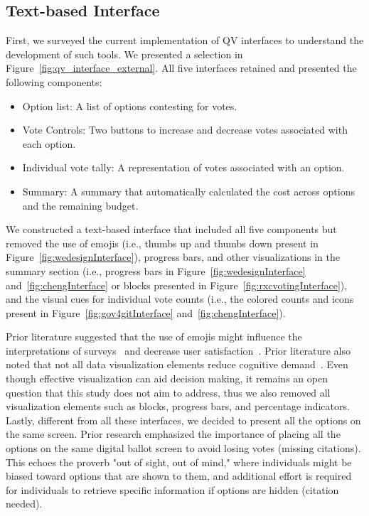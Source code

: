 \subsection{Text-based Interface}
First, we surveyed the current implementation of QV interfaces to understand the development of such tools. We presented a selection in Figure~\ref{fig:qv_interface_external}. All five interfaces retained and presented the following components:
\begin{itemize}
    \item Option list: A list of options contesting for votes.
    \item Vote Controls: Two buttons to increase and decrease votes associated with each option.
    \item Individual vote tally: A representation of votes associated with an option.
    \item Summary: A summary that automatically calculated the cost across options and the remaining budget.
\end{itemize}

We constructed a text-based interface that included all five components but removed the use of emojis (i.e., thumbs up and thumbs down present in Figure~\ref{fig:wedesignInterface}), progress bars, and other visualizations in the summary section (i.e., progress bars in Figure~\ref{fig:wedesignInterface} and~\ref{fig:chengInterface} or blocks presented in Figure~\ref{fig:rxcvotingInterface}), and the visual cues for individual vote counts (i.e., the colored counts and icons present in Figure~\ref{fig:gov4gitInterface} and~\ref{fig:chengInterface}).

Prior literature suggested that the use of emojis might influence the interpretations of surveys~\cite{herringGenderAgeInfluences2020} and decrease user satisfaction~\cite{toepoelSmileysStarsHearts2019}. Prior literature also noted that not all data visualization elements reduce cognitive demand~\cite{huangMeasuringEffectivenessGraph2009a}. Even though effective visualization can aid decision making, it remains an open question that this study does not aim to address, thus we also removed all visualization elements such as blocks, progress bars, and percentage indicators. Lastly, different from all these interfaces, we decided to present all the options on the same screen. Prior research emphasized the importance of placing all the options on the same digital ballot screen to avoid losing votes (missing citations). This echoes the proverb "out of sight, out of mind," where individuals might be biased toward options that are shown to them, and additional effort is required for individuals to retrieve specific information if options are hidden (citation needed).

